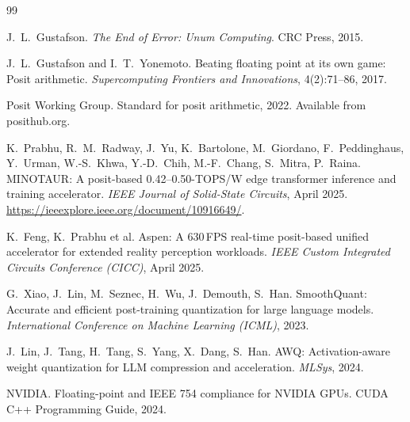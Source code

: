 \documentclass[11pt,a4paper]{article}
\begin{document}
\begin{thebibliography}{99}

J.~L.~Gustafson.
\newblock \emph{The End of Error: Unum Computing}.
\newblock CRC Press, 2015.

J.~L.~Gustafson and I.~T.~Yonemoto.
\newblock Beating floating point at its own game: Posit arithmetic.
\newblock \emph{Supercomputing Frontiers and Innovations},
4(2):71--86, 2017.

Posit Working Group.
\newblock Standard for posit arithmetic, 2022.
\newblock Available from posithub.org.

K.~Prabhu, R.~M.~Radway, J.~Yu, K.~Bartolone, M.~Giordano, F.~Peddinghaus,
Y.~Urman, W.-S.~Khwa, Y.-D.~Chih, M.-F.~Chang, S.~Mitra, P.~Raina.
\newblock MINOTAUR: A posit-based 0.42--0.50-TOPS/W edge transformer
inference and training accelerator.
\newblock \emph{IEEE Journal of Solid-State Circuits}, April 2025.
\newblock \url{https://ieeexplore.ieee.org/document/10916649/}.

K.~Feng, K.~Prabhu et al.
\newblock Aspen: A 630\,FPS real-time posit-based unified accelerator
for extended reality perception workloads.
\newblock \emph{IEEE Custom Integrated Circuits Conference (CICC)},
April 2025.

G.~Xiao, J.~Lin, M.~Seznec, H.~Wu, J.~Demouth, S.~Han.
\newblock SmoothQuant: Accurate and efficient post-training
quantization for large language models.
\newblock \emph{International Conference on Machine Learning (ICML)},
2023.

J.~Lin, J.~Tang, H.~Tang, S.~Yang, X.~Dang, S.~Han.
\newblock AWQ: Activation-aware weight quantization for LLM
compression and acceleration.
\newblock \emph{MLSys}, 2024.

NVIDIA.
\newblock Floating-point and IEEE 754 compliance for NVIDIA GPUs.
\newblock CUDA C++ Programming Guide, 2024.

\end{thebibliography}
\end{document}
